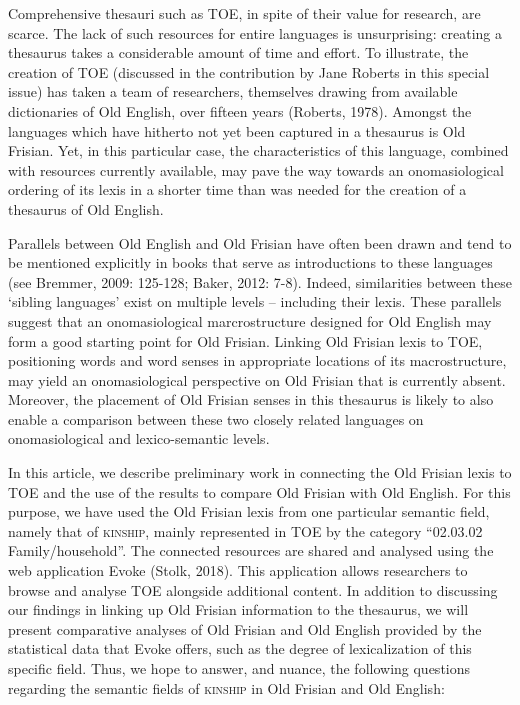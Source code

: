 Comprehensive thesauri such as TOE, in spite of their value for research, are scarce. The lack of such resources for entire languages is unsurprising: creating a thesaurus takes a considerable amount of time and effort. To illustrate, the creation of TOE (discussed in the contribution by Jane Roberts in this special issue) has taken a team of researchers, themselves drawing from available dictionaries of Old English, over fifteen years (Roberts, 1978). Amongst the languages which have hitherto not yet been captured in a thesaurus is Old Frisian. Yet, in this particular case, the characteristics of this language, combined with resources currently available, may pave the way towards an onomasiological ordering of its lexis in a shorter time than was needed for the creation of a thesaurus of Old English.

Parallels between Old English and Old Frisian have often been drawn and tend to be mentioned explicitly in books that serve as introductions to these languages (see Bremmer, 2009: 125-128; Baker, 2012: 7-8). Indeed, similarities between these ‘sibling languages’ exist on multiple levels – including their lexis. These parallels suggest that an onomasiological marcrostructure designed for Old English may form a good starting point for Old Frisian. Linking Old Frisian lexis to TOE, positioning words and word senses in appropriate locations of its macrostructure, may yield an onomasiological perspective on Old Frisian that is currently absent. Moreover, the placement of Old Frisian senses in this thesaurus is likely to also enable a comparison between these two closely related languages on onomasiological and lexico-semantic levels.

In this article, we describe preliminary work in connecting the Old Frisian lexis to TOE and the use of the results to compare Old Frisian with Old English. For this purpose, we have used the Old Frisian lexis from one particular semantic field, namely that of \textsc{kinship}, mainly represented in TOE by the category “02.03.02 Family/household”.  The connected resources are shared and analysed using the web application Evoke (Stolk, 2018). This application allows researchers to browse and analyse TOE alongside additional content. In addition to discussing our findings in linking up Old Frisian information to the thesaurus, we will present comparative analyses of Old Frisian and Old English provided by the statistical data that Evoke offers, such as the degree of lexicalization of this specific field. Thus, we hope to answer, and nuance, the following questions regarding the semantic fields of \textsc{kinship} in Old Frisian and Old English:

